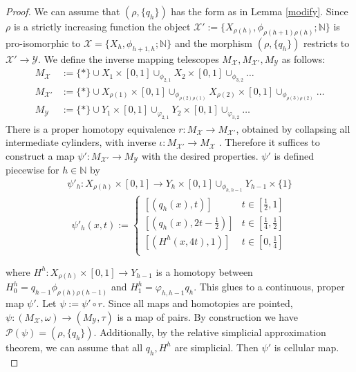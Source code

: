 \documentclass[a4paper,11pt]{article}
\theoremstyle{definition}
\theoremstyle{plain}
\theoremstyle{remark}
\begin{document}
{\begin{proof} We can assume that $(\rho,\{q_{h}\})$ has the form as in Lemma \ref{modify}.  Since $\rho$ is a strictly increasing function the object $\mathcal{X}':=\{X_{\rho(h)}, \phi_{\rho(h+1)\rho(h)}; \mathbb{N}\}$ is pro-isomorphic to $\mathcal{X}=\{X_{h}, \phi_{h+1, h}; \mathbb{N}\}$ and the morphism $(\rho,\{q_{h}\})$ restricts to $\mathcal{X}'\rightarrow \mathcal{Y}$. We define the inverse mapping telescopes $M_{\mathcal{X}}, M_{\mathcal{X}'}, M_{\mathcal{Y}}$ as follows:
\begin{align*}
M_{\mathcal{X}}&:= \{\ast\} \cup X_{1} \times [0,1] \cup_{\phi_{2,1}} X_{2} \times [0,1] \cup_{\phi_{3,2}} \dots\\
M_{\mathcal{X}'}&:= \{\ast\} \cup X_{\rho(1)} \times [0,1] \cup_{\phi_{\rho(2)\rho(1)}} X_{\rho(2)} \times [0,1] \cup_{\phi_{\rho(3)\rho(2)}} \dots \\
M_{\mathcal{Y}}&:= \{\ast\} \cup Y_{1} \times [0,1] \cup_{\varphi_{2,1}} Y_{2} \times [0,1] \cup_{\varphi_{3,2}} \dots
\end{align*}
There is a proper homotopy equivalence $r: M_{\mathcal{X}}\rightarrow M_{\mathcal{X}'}$, obtained by collapsing all intermediate cylinders, with inverse $\iota: M_{\mathcal{X}'}\rightarrow M_{\mathcal{X}}$ . Therefore it suffices to construct a map $\psi': M_{\mathcal{X}'}\rightarrow M_{\mathcal{Y}}$ with the desired properties. $\psi'$ is defined piecewise for $h\in \mathbb{N}$ by 
\begin{align*}
\psi'_{h}: X_{\rho(h)} \times [0,1] \rightarrow Y_{h} \times [0,1] \cup_{\phi_{h,h-1}} Y_{h-1} \times \{1\}
\end{align*}
 \[ \psi'_{h}(x,t) := \begin{cases} 
          [(q_{h}(x), t)]& t\in [\frac{1}{2},1] \\
          [(q_{h}(x), 2t-\frac{1}{2})]& t\in [\frac{1}{4},\frac{1}{2}]\\ 
	 [(H^h(x,4t),1)]& t\in [0,\frac{1}{4}]\\ 
       \end{cases}  \] 

where $H^h: X_{\rho(h)} \times [0,1]\rightarrow Y_{h-1}$ is a homotopy between $H^h_{0} = q_{h-1} \phi_{\rho(h)\rho(h-1)}$ and $H^h_1 = \varphi_{h,h-1} q_{h}$. This glues to a continuous, proper map $\psi'$. Let $\psi:= \psi' \circ r$. Since all maps and homotopies are pointed, $\psi: (M_{\mathcal{X}},\omega)\rightarrow (M_{\mathcal{Y}},\tau)$ is a map of pairs. By construction we have $\mathcal{P}(\psi) = (\rho,\{q_{h}\})$. Additionally, by the relative simplicial approximation theorem, we can assume that all $q_{h}, H^h$ are simplicial. Then $\psi'$ is cellular map.\\


\end{proof}}
\end{document}
